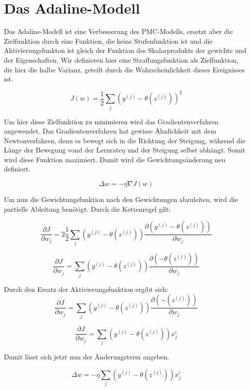 \documentclass[11pt]{article} %
\begin{document}
\section{Das Adaline-Modell}
Das Adaline-Modell ist eine Verbesserung des PMC-Modells, ersetzt aber die Zielfunktion durch eine Funktion, die keine Stufenfunktion ist und die Aktivierungsfunkton ist gleich der Funktion des Skalarprodukts der gewichte und der Eigenschaften. Wir definieren hier eine Straffungsfunktion als Zielfunktion, die hier die halbe Varianz, geteilt durch die Wahrscheinlichkeit dieses Ereignisses ist.

\begin{equation}
J(w) = \frac{1}{2} \sum_{j}(y^{(j)} - \theta{(z^{(j)})})^2
\end{equation}
 
Um hier diese Zielfunktion zu minimieren wird das Gradientenverfahren angewendet. Das Gradientenverfahren hat gewisse Ähnlichkeit mit
dem Newtonverfahren, denn es bewegt sich in die Richtung der Steigung, während die Länge der Bewegung vond der Lernrate$\eta$ und der Steigung selbst abhängt. Somit wird diese Funktion maximiert. Damit wird die Gewichtungsänderung neu definiert. 

\begin{equation}
\Delta w = -\eta \nabla J(w)
\end{equation}

Um nun die Gewichtungsfunktion nach den Gewichtungen abzuleiten, wird die partielle Ableitung benötigt. Durch die Kettenregel gilt:

\begin{equation}
\frac{\partial J}{\partial w_{j}} = 2 \frac{1}{2} \sum_{j}(y^{(j)} - \theta{(z^{(j)})}) \frac{\partial (y^{(j)} - \theta{(z^{(j)})})}{\partial w_{j}}
\end{equation}

\begin{equation}
\frac{\partial J}{\partial w_{j}} = \sum_{j}(y^{(j)} - \theta{(z^{(j)})}) \frac{\partial ( - \theta{(z^{(j)})})}{\partial w_{j}}
\end{equation}

Durch den Ersatz der Aktivierungsfunktion ergibt sich:
\begin{equation}
\frac{\partial J}{\partial w_{j}} = \sum_{j}(y^{(j)} - \theta{(z^{(j)})}) \frac{\partial ( - (z^{(j)}))}{\partial w_{j}}
\end{equation}

\begin{equation}
\frac{\partial J}{\partial w_{j}} = \sum_{j}(y^{(j)} - \theta{(z^{(j)})}) x^{i}_{j}
\end{equation}

Damit lässt sich jetzt nun der Änderungsterm angeben.

\begin{equation}
\Delta w = -\eta \sum_{j}(y^{(j)} - \theta{(z^{(j)})}) x^{i}_{j}
\end{equation}
\end{document}
